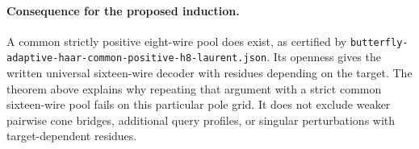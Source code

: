 \documentclass[11pt]{article}
\begin{document}
\paragraph{Consequence for the proposed induction.}
A common strictly positive eight-wire pool does exist, as certified by
\texttt{butterfly-adaptive-haar-common-positive-h8-laurent.json}.
Its openness gives the written universal sixteen-wire decoder with
residues depending on the target. The theorem above explains why
repeating that argument with a strict common sixteen-wire pool fails
on this particular pole grid. It does not exclude weaker pairwise
cone bridges, additional query profiles, or singular perturbations
with target-dependent residues.
\end{document}
